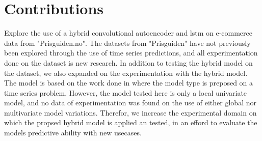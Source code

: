 
\section{Contributions}
\label{section:Discussion:Contributions}

Explore the use of a hybrid convolutional autoencoder and lstm on e-commerce data from "Prisguiden.no".
The datasets from "Prisguiden" have not previously been explored through the use of time series predictions,
and all experimentation done on the dataset is new research.
In addition to testing the hybrid model on the dataset,
we also expanded on the experimentation with the hybrid model.
The model is based on the work done in \cite{Zhao2019} where the model type is preposed on a time series problem.
However, the model tested here is only a local univariate model, and no data of experimentation was found
on the use of either global nor multivariate model variations.
Therefor, we increase the experimental domain on which the propsed hybrid model is applied an tested,
in an efford to evaluate the models predictive ability with new usecases.

